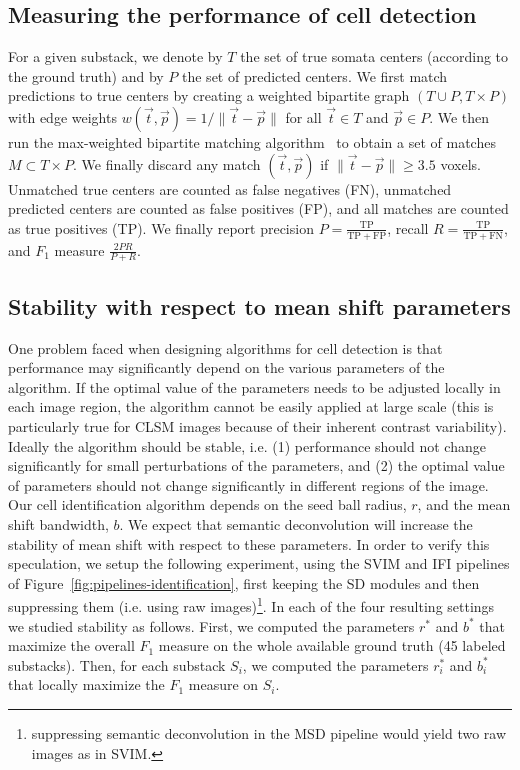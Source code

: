 \documentclass[smallextended]{svjour3}       %
\begin{document}
\subsection{Measuring the performance of cell detection}
\label{sec:performance-evaluation}

For a given substack, we denote by $T$ the set of true somata centers
(according to the ground truth) and by $P$ the set of predicted
centers. We first match predictions to true centers by creating a
weighted bipartite graph $(T\cup P, T\times P)$ with edge weights
$w(\vec{t},\vec{p}) = 1/\|\vec{t}-\vec{p}\|$ for all $\vec{t}\in T$ and $\vec{p}\in P$. We
then run the max-weighted bipartite matching
algorithm~\cite{galil_efficient_1986} to obtain a set of matches
$M\subset T\times P$. We finally discard any match $(\vec{t},\vec{p})$ if
$\|\vec{t}-\vec{p}\|\geq 3.5$ voxels.
Unmatched true centers are counted as false negatives (FN), unmatched
predicted centers are counted as false positives (FP), and all matches
are counted as true positives (TP). We finally report precision
$P=\frac{\mathrm{TP}}{\mathrm{TP}+\mathrm{FP}}$, recall
$R=\frac{\mathrm{TP}}{\mathrm{TP}+\mathrm{FN}}$, and $F_1$ measure
$\frac{2PR}{P+R}$.


\subsection{Stability with respect to mean shift parameters}
\label{sec:stability}
One problem faced when designing algorithms for cell detection is that
performance may significantly depend on the various parameters of the
algorithm. If the optimal value of the parameters needs to be adjusted
locally in each image region, the algorithm cannot be easily applied at
large scale (this is particularly true for CLSM images because of
their inherent contrast variability). Ideally the algorithm should be
stable, i.e. (1) performance should not change significantly for small
perturbations of the parameters, and (2) the optimal value of
parameters should not change significantly in different regions of the
image.  Our cell identification algorithm depends on the seed ball
radius, $r$, and the mean shift bandwidth, $b$. We expect that
semantic deconvolution will increase the stability of mean shift with
respect to these parameters. In order to verify this speculation, we
setup the following experiment, using the SVIM and IFI pipelines of
Figure~\ref{fig:pipelines-identification}, first keeping the SD
modules and then suppressing them (i.e. using raw
images)\footnote{suppressing semantic deconvolution in the MSD
  pipeline would yield two raw images as in SVIM.}. In each of the four resulting
settings we studied stability as follows.  First, we computed the
parameters $r^*$ and $b^*$ that maximize the overall $F_1$ measure on
the whole available ground truth (45 labeled substacks). Then, for
each substack $S_i$, we computed the parameters $r^*_i$ and $b^*_i$
that locally maximize the $F_1$ measure on $S_i$. 
\end{document}
